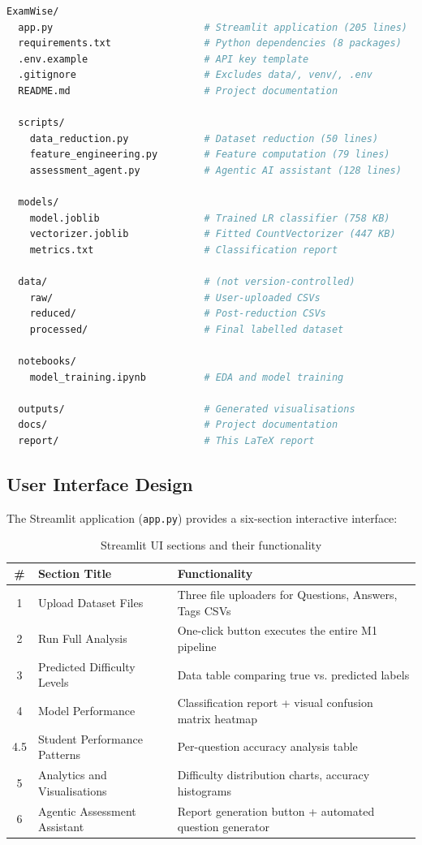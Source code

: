 \documentclass[12pt, a4paper]{article}
\begin{document}
\begin{lstlisting}[language=bash, caption={Complete repository file structure}]
ExamWise/
  app.py                          # Streamlit application (205 lines)
  requirements.txt                # Python dependencies (8 packages)
  .env.example                    # API key template
  .gitignore                      # Excludes data/, venv/, .env
  README.md                       # Project documentation

  scripts/
    data_reduction.py             # Dataset reduction (50 lines)
    feature_engineering.py        # Feature computation (79 lines)
    assessment_agent.py           # Agentic AI assistant (128 lines)

  models/
    model.joblib                  # Trained LR classifier (758 KB)
    vectorizer.joblib             # Fitted CountVectorizer (447 KB)
    metrics.txt                   # Classification report

  data/                           # (not version-controlled)
    raw/                          # User-uploaded CSVs
    reduced/                      # Post-reduction CSVs
    processed/                    # Final labelled dataset

  notebooks/
    model_training.ipynb          # EDA and model training

  outputs/                        # Generated visualisations
  docs/                           # Project documentation
  report/                         # This LaTeX report
\end{lstlisting}

\subsection{User Interface Design}

The Streamlit application (\texttt{app.py}) provides a six-section interactive interface:

\begin{table}[H]
\centering
\caption{Streamlit UI sections and their functionality}
\label{tab:ui-sections}
\begin{tabularx}{\textwidth}{clX}
\toprule
\textbf{\#} & \textbf{Section Title} & \textbf{Functionality} \\
\midrule
1 & Upload Dataset Files & Three file uploaders for Questions, Answers, Tags CSVs \\
2 & Run Full Analysis & One-click button executes the entire M1 pipeline \\
3 & Predicted Difficulty Levels & Data table comparing true vs. predicted labels \\
4 & Model Performance & Classification report + visual confusion matrix heatmap \\
4.5 & Student Performance Patterns & Per-question accuracy analysis table \\
5 & Analytics and Visualisations & Difficulty distribution charts, accuracy histograms \\
6 & Agentic Assessment Assistant & Report generation button + automated question generator \\
\bottomrule
\end{tabularx}
\end{table}
\end{document}
